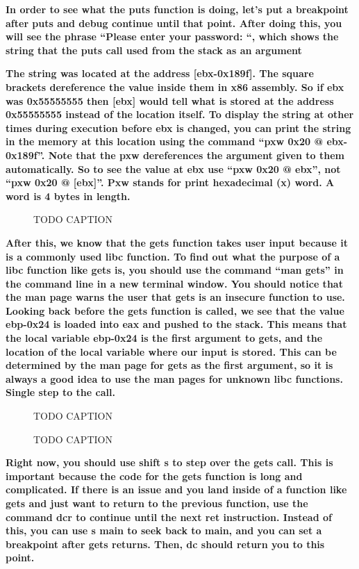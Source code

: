 \documentclass[letterpaper]{article}
\newcommand{\sitfig}[3]{
\begin{figure}[H]
\centering
\makebox[\textwidth][c]{
#2
}
\caption{#3}
\label{#1}
\end{figure}
}
\newcommand{\sitgfx}[4][scale=1.0]{
\sitfig{#3}{\texttt{[image: \#2]}}{#4}
}
\begin{document}
\textbf{In order to see what the puts function is doing, let's put a breakpoint after puts and debug continue until that
point. After doing this, you will see the phrase ``Please enter your password: ``, which shows the string that the puts
call used from the stack as an argument}

\textbf{The string was located at the address [ebx-0x189f]. The square brackets dereference the value inside them in x86
assembly. So if ebx was 0x55555555 then [ebx] would tell what is stored at the address 0x55555555 instead of the
location itself. To display the string at other times during execution before ebx is changed, you can print the string
in the memory at this location using the command ``pxw 0x20 @ ebx-0x189f''. Note that the pxw dereferences the argument
given to them automatically. So to see the value at ebx use ``pxw 0x20 @ ebx'', not ``pxw 0x20 @ [ebx]''. Pxw stands
for print hexadecimal (x) word. A word is 4 bytes in length. }

  
\sitgfx[width=6.5in,height=4.0626in]{FINALWORKINGDOCFORMERLYPRECURSOR-img058.png}{fig:unk}{TODO CAPTION}
 

\textbf{After this, we know that the gets function takes user input because it is a commonly used libc function. To find
out what the purpose of a libc function like gets is, you should use the command ``man gets'' in the command line in a
new terminal window. You should notice that the man page warns the user that gets is an insecure function to use.
Looking back before the gets function is called, we see that the value ebp-0x24 is loaded into eax and pushed to the
stack. This means that the local variable ebp-0x24 is the first argument to gets, and the location of the local
variable where our input is stored. This can be determined by the man page for gets as the first argument, so it is
always a good idea to use the man pages for unknown libc functions. Single step to the call.}

  
\sitgfx[width=6.5in,height=4.0626in]{FINALWORKINGDOCFORMERLYPRECURSOR-img059.png}{fig:unk}{TODO CAPTION}
 

  
\sitgfx[width=6.5in,height=4.0626in]{FINALWORKINGDOCFORMERLYPRECURSOR-img060.png}{fig:unk}{TODO CAPTION}
 

\textbf{Right now, you should use shift s to step over the gets call. This is important because the code for the gets
function is long and complicated. If there is an issue and you land inside of a function like gets and just want to
return to the previous function, use the command dcr to continue until the next ret instruction. Instead of this, you
can use s main to seek back to main, and you can set a breakpoint after gets returns. Then, dc should return you to
this point.}
\end{document}
